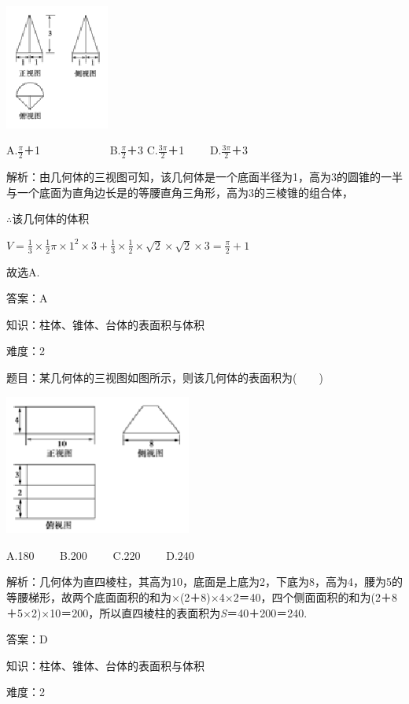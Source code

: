 \documentclass{article} %
\begin{document}
\includegraphics*[width=1.34in, height=1.61in, keepaspectratio=false]{image67}

A.$\frac{\pi}{2}$＋1　　　　　　 B.$\frac{\pi}{2}$＋3 C.$\frac{3\pi}{2}$＋1　　 D.$\frac{3\pi}{2}$＋3

解析：由几何体的三视图可知，该几何体是一个底面半径为1，高为3的圆锥的一半与一个底面为直角边长是的等腰直角三角形，高为3的三棱锥的组合体，

$\mathrm{\therefore}$该几何体的体积

$V=\frac{1}{3}\times\frac{1}{2}\pi\times1^2\times 3+\frac{1}{3}\times\frac{1}{2}\times\sqrt{2}\times\sqrt{2}\times 3=\frac{\pi}{2}+1$

故选A.

答案：A

知识：柱体、锥体、台体的表面积与体积

难度：2

题目：某几何体的三视图如图所示，则该几何体的表面积为(　　)

\includegraphics*[width=2.42in, height=1.81in, keepaspectratio=false]{image68}

A.180　　 B.200　　 C.220　　 D.240

解析：几何体为直四棱柱，其高为10，底面是上底为2，下底为8，高为4，腰为5的等腰梯形，故两个底面面积的和为$\mathrm{\times}$(2＋8)$\mathrm{\times}$4$\mathrm{\times}$2＝40，四个侧面面积的和为(2＋8＋5$\mathrm{\times}$2)$\mathrm{\times}$10＝200，所以直四棱柱的表面积为\textit{S}＝40＋200＝240.

答案：D

知识：柱体、锥体、台体的表面积与体积

难度：2
\end{document}
